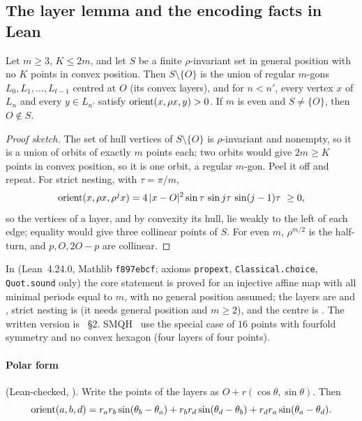 \subsection{The layer lemma and the encoding facts in Lean}\label{k8:sec:lean}

\begin{lemma}\label{k8:layer}
Let $m\ge3$, $K\le2m$, and let $S$ be a finite $\rho$-invariant set in general position with no $K$ points in
convex position. Then $S\setminus\{O\}$ is the union of regular $m$-gons $L_0,L_1,\dots,L_{t-1}$ centred at $O$ (its
convex layers), and for $n<n'$, every vertex $x$ of $L_n$ and every $y\in L_{n'}$ satisfy $\operatorname{orient}(x,\rho x,y)>0$. If $m$
is even and $S\ne\{O\}$, then $O\notin S$.
\end{lemma}

\begin{proof}[Proof sketch]
The set of hull vertices of $S\setminus\{O\}$ is $\rho$-invariant and nonempty, so it is a union of orbits of exactly
$m$ points each; two orbits would give $2m\ge K$ points in convex position, so it is one orbit, a regular $m$-gon. Peel
it off and repeat. For strict nesting, with $\tau=\pi/m$,
\[
\operatorname{orient}(x,\rho x,\rho^j x)=4\,|x-O|^2\sin\tau\,\sin j\tau\,\sin(j-1)\tau\ \ge0,
\]
so the vertices of a layer, and by convexity its hull, lie weakly to the left of each edge; equality would give three
collinear points of $S$. For even $m$, $\rho^{m/2}$ is the half-turn, and $p,O,2O-p$ are collinear.
\end{proof}

In  (Lean~4.24.0, Mathlib \texttt{f897ebcf}; axioms \texttt{propext},
\texttt{Classical.choice}, \texttt{Quot.sound} only) the core statement  is proved for an
injective affine map with all minimal periods equal to $m$, with no general position assumed; the layers are
 and , strict nesting is  (it needs general position and
$m\ge2$), and the centre is . The written version is ~\S2.
SMQH~\cite[\S3.2]{SMQH25} use the special case of $16$ points with fourfold symmetry and no convex hexagon (four layers
of four points).

\paragraph{Polar form} (Lean-checked, ). Write the points of the layers as $O+r(\cos\theta,\sin\theta)$. Then
\[
\operatorname{orient}(a,b,d)=r_ar_b\sin(\theta_b-\theta_a)+r_br_d\sin(\theta_d-\theta_b)+r_dr_a\sin(\theta_a-\theta_d).
\]


